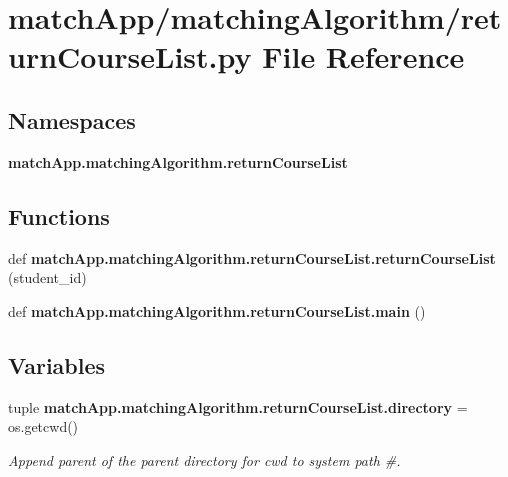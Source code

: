 \section{match\+App/matching\+Algorithm/return\+Course\+List.py File Reference}
\label{return_course_list_8py}
\subsection*{Namespaces}
\begin{DoxyCompactItemize}
\item 
 {\bf match\+App.\+matching\+Algorithm.\+return\+Course\+List}
\end{DoxyCompactItemize}
\subsection*{Functions}
\begin{DoxyCompactItemize}
\item 
def {\bf match\+App.\+matching\+Algorithm.\+return\+Course\+List.\+return\+Course\+List} (student\+\_\+id)
\item 
def {\bf match\+App.\+matching\+Algorithm.\+return\+Course\+List.\+main} ()
\end{DoxyCompactItemize}
\subsection*{Variables}
\begin{DoxyCompactItemize}
\item 
tuple {\bf match\+App.\+matching\+Algorithm.\+return\+Course\+List.\+directory} = os.\+getcwd()
\begin{DoxyCompactList}\small\item\em Append parent of the parent directory for cwd to system path \#. \end{DoxyCompactList}\end{DoxyCompactItemize}
